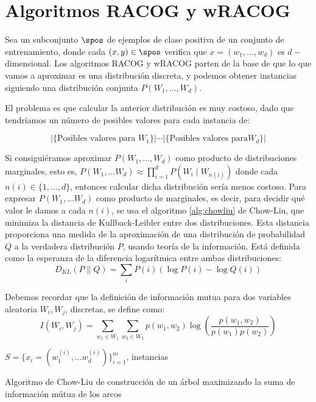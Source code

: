 \section{Algoritmos RACOG y wRACOG}
Sea un subconjunto $\spos$ de ejemplos de clase positiva de un conjunto de entrenamiento, donde cada $(x,y)\in \spos$ 
verifica que $x = (w_1, \ldots, w_d)$ es $d-$dimensional. Los algoritmos RACOG y wRACOG parten de la base de que lo que vamos
a aproximar es una distribución discreta, y podemos obtener instancias siguiendo una distribución 
conjunta $P(W_1, \ldots, W_d)$.

El problema es que calcular la anterior distribución es muy costoso, dado que tendríamos un número de posibles valores para 
cada instancia de:

\[|\{\textrm{Posibles valores para }W_1\}| \cdots |\{\textrm{Posibles valores para} W_d\}|\]

Si consiguiéramos aproximar $P(W_1, \ldots, W_d)$ como producto de distribuciones marginales, esto es, 
$P(W_1, \ldots W_d) \approx \prod_{i=1}^d P(W_i \mid W_{n(i)})$ donde cada $n(i) \in \{1, \ldots, d\}$,
entonces calcular dicha distribución sería menos costoso. Para expresar $P(W_1, \ldots W_d)$ como producto de marginales,
es decir, para decidir qué valor le damos a cada $n(i)$, se usa el algoritmo \ref{alg:chowliu} de Chow-Liu,
que minimiza la distancia de Kullback-Leibler entre dos distribuciones. Esta distancia proporciona una medida de la 
aproximación de una distribución de probabilidad $Q$ a la verdadera distribución $P$, usando teoría de la información. 
Está definida como la esperanza de la diferencia logarítmica entre ambas distribuciones:
\[
  D_{KL}(P \parallel Q) = \sum_{i} P(i) \left(\log P(i) - \log Q(i)\right)
\]

Debemos recordar que la definición de información mutua para dos variables aleatoria $W_i, W_j$, discretas, 
se define como:
\[
  I(W_i, W_j) = \sum_{w_1\in W_1} \sum_{w_2\in W_2} p(w_1, w_2) \log\left(\frac{p(w_1,w_2)}{p(w_1) p(w_2)}\right)
\]

\begin{algorithm}[H]
\begin{algorithmic}[1]
 \REQUIRE $S = \{x_i=(w_1^{(i)}, \ldots w_d^{(i)})\}_{i=1}^m$, instancias
 \ENDFOR
\end{algorithmic}
\caption{Algoritmo de Chow-Liu de construcción de un árbol maximizando la suma de información
mútua de los arcos}
\label{alg:chowliu}
\end{algorithm}

